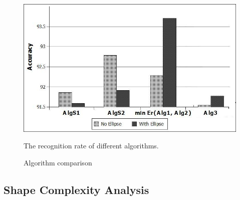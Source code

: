 \documentclass{article}
\begin{document}
 \begin{figure}
	\centering		
	 \includegraphics[scale=0.4]{images/testAlg.jpg}
	 	\caption{Algorithm comparison} The recognition rate of different algorithms. 
	 	\label{fig:test1}
\end{figure} 


\subsection{Shape Complexity Analysis}
\label{sec:ShapeComplexityExperiments}
\end{document}
